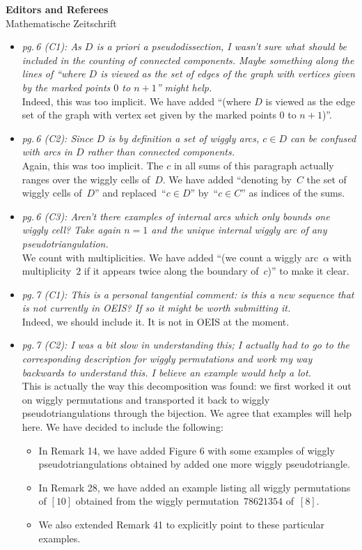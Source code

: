 \documentclass{letter}
\begin{document}
\begin{letter}{{\bf Editors and Referees} \\ Mathematische Zeitschrift}
\begin{itemize}
\item \textsl{\color{gray} pg.\,6 (C1): As $D$ is a priori a pseudodissection, I wasn't sure what should be included in the counting of connected components. Maybe something along the lines of ``where $D$ is viewed as the set of edges of the graph with vertices given by the marked points $0$ to $n+1$'' might help.} \\
Indeed, this was too implicit. We have added ``(where $D$ is viewed as the edge set of the graph with vertex set given by the marked points $0$ to $n+1$)''.

\item \textsl{\color{gray} pg.\,6 (C2): Since $D$ is by definition a set of wiggly arcs, $c \in D$ can be confused with arcs in $D$ rather than connected components.} \\
Again, this was too implicit. The $c$ in all sums of this paragraph actually ranges over the wiggly cells of~$D$. We have added ``denoting by~$C$ the set of wiggly cells of~$D$'' and replaced~``$c \in D$'' by~``$c \in C$'' as indices of the sums.

\item \textsl{\color{gray} pg.\,6 (C3): Aren’t there examples of internal arcs which only bounds one wiggly cell? Take again $n = 1$ and the unique internal wiggly arc of any pseudotriangulation.} \\
We count with multiplicities. We have added ``(we count a wiggly arc~$\alpha$ with multiplicity~$2$ if it appears twice along the boundary of~$c$)'' to make it clear.

\item \textsl{\color{gray} pg.\,7 (C1): This is a personal tangential comment: is this a new sequence that is not currently in OEIS? If so it might be worth submitting it.} \\
Indeed, we should include it. It is not in OEIS at the moment.

\item \textsl{\color{gray} pg.\,7 (C2): I was a bit slow in understanding this; I actually had to go to the corresponding description for wiggly permutations and work my way backwards to understand this. I believe an example would help a lot.} \\
This is actually the way this decomposition was found: we first worked it out on wiggly permutations and transported it back to wiggly pseudotriangulations through the bijection.
We agree that examples will help here. We have decided to include the following:
\begin{itemize}
\item In Remark 14, we have added Figure 6 with some examples of wiggly pseudotriangulations obtained by added one more wiggly pseudotriangle.
\item In Remark 28, we have added an example listing all wiggly permutations of $[10]$ obtained from the wiggly permutation~$78621354$ of~$[8]$.
\item We also extended Remark 41 to explicitly point to these particular examples.
\end{itemize}


\end{itemize}
\end{letter}
\end{document}
